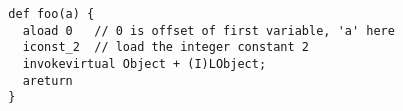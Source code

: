 {\tiny \begin{verbatim}
  def foo(a) {
    aload 0   // 0 is offset of first variable, 'a' here
    iconst_2  // load the integer constant 2
    invokevirtual Object + (I)LObject;
    areturn 
  }
\end{verbatim} }
